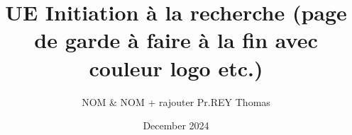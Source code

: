 \begin{titlepage}
\title{UE Initiation à la recherche (page de garde à faire à la fin avec couleur logo etc.)}
\author{NOM & NOM + rajouter Pr.REY Thomas}
\date{December 2024}
\end{titlepage}
\maketitle